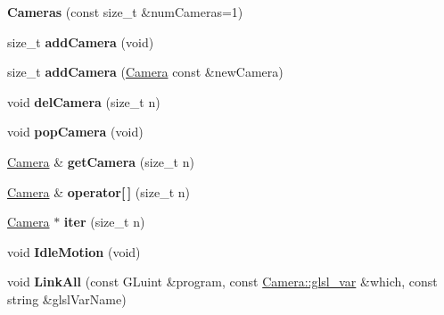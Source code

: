 \begin{DoxyCompactItemize}
\item 
\hypertarget{class_cameras_a35c195ae1a970836e7192bac0f34fb54}{{\bfseries \-Cameras} (const size\-\_\-t \&num\-Cameras=1)}\label{class_cameras_a35c195ae1a970836e7192bac0f34fb54}

\item 
\hypertarget{class_cameras_ae6eb54cc68dd582db6f808a603031c56}{size\-\_\-t {\bfseries add\-Camera} (void)}\label{class_cameras_ae6eb54cc68dd582db6f808a603031c56}

\item 
\hypertarget{class_cameras_ac5292f6f0d6c151390e5564548b72935}{size\-\_\-t {\bfseries add\-Camera} (\hyperlink{class_camera}{\-Camera} const \&new\-Camera)}\label{class_cameras_ac5292f6f0d6c151390e5564548b72935}

\item 
\hypertarget{class_cameras_aaa690f1a47ebe431dbda55fba958ca38}{void {\bfseries del\-Camera} (size\-\_\-t n)}\label{class_cameras_aaa690f1a47ebe431dbda55fba958ca38}

\item 
\hypertarget{class_cameras_a9dee7bf1f2c56176c461fa2617ce4549}{void {\bfseries pop\-Camera} (void)}\label{class_cameras_a9dee7bf1f2c56176c461fa2617ce4549}

\item 
\hypertarget{class_cameras_a0e5181cf91f009ae2709533f2184ddb0}{\hyperlink{class_camera}{\-Camera} \& {\bfseries get\-Camera} (size\-\_\-t n)}\label{class_cameras_a0e5181cf91f009ae2709533f2184ddb0}

\item 
\hypertarget{class_cameras_aeee13e4cc6eb085a65af9ef6bf3a549a}{\hyperlink{class_camera}{\-Camera} \& {\bfseries operator\mbox{[}$\,$\mbox{]}} (size\-\_\-t n)}\label{class_cameras_aeee13e4cc6eb085a65af9ef6bf3a549a}

\item 
\hypertarget{class_cameras_a91bd6744be5f876bd74e65134da8653a}{\hyperlink{class_camera}{\-Camera} $\ast$ {\bfseries iter} (size\-\_\-t n)}\label{class_cameras_a91bd6744be5f876bd74e65134da8653a}

\item 
\hypertarget{class_cameras_acb3907c96b7d147b7bcc1aad42f8da6f}{void {\bfseries \-Idle\-Motion} (void)}\label{class_cameras_acb3907c96b7d147b7bcc1aad42f8da6f}

\item 
\hypertarget{class_cameras_a5300fe1aefc42b41151dbb55aff1c978}{void {\bfseries \-Link\-All} (const \-G\-Luint \&program, const \hyperlink{class_camera_a6ff726a75a430e4f17e5dec42e4d4405}{\-Camera\-::glsl\-\_\-var} \&which, const string \&glsl\-Var\-Name)}\label{class_cameras_a5300fe1aefc42b41151dbb55aff1c978}


\end{DoxyCompactItemize}
